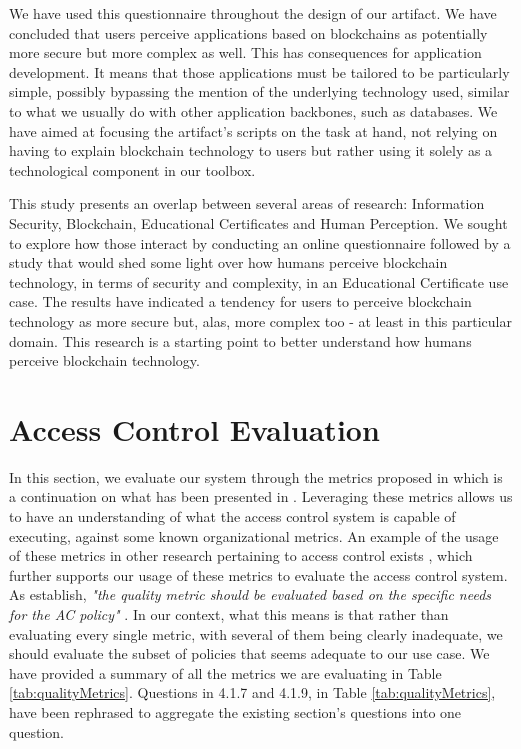 We have used this questionnaire throughout the design of our artifact. We have concluded that users perceive applications based on blockchains as potentially more secure but more complex as well. This has consequences for application development. It means that those applications must be tailored to be particularly simple, possibly bypassing the mention of the underlying technology used, similar to what we usually do with other application backbones, such as databases. We have aimed at focusing the artifact's scripts on the task at hand, not relying on having to explain blockchain technology to users but rather using it solely as a technological component in our toolbox.

This study presents an overlap between several areas of research: Information Security, Blockchain, Educational Certificates and Human Perception. We sought to explore how those interact by conducting an online questionnaire followed by a study that would shed some light over how humans perceive blockchain technology, in terms of security and complexity, in an Educational Certificate use case. The results have indicated a tendency for users to perceive blockchain technology as more secure but, alas, more complex too - at least in this particular domain. This research is a starting point to better understand how humans perceive blockchain technology.

\section{Access Control Evaluation}

In this section, we evaluate our system through the metrics proposed in \cite{hu_guidelines_2012} which is a continuation on what has been presented in \cite{hu_assessment_2006}. Leveraging these metrics allows us to have an understanding of what the access control system is capable of executing, against some known organizational metrics. An example of the usage of these metrics in other research pertaining to access control exists \cite{LE2014184}, which further supports our usage of these metrics to evaluate the access control system. As \citeauthor{hu_guidelines_2012} \cite{hu_guidelines_2012} establish, \emph{"the quality metric should be evaluated based on the specific needs for the AC policy"} \cite[25]{hu_guidelines_2012}. In our context, what this means is that rather than evaluating every single metric, with several of them being clearly inadequate, we should evaluate the subset of policies that seems adequate to our use case. We have provided a summary of all the metrics we are evaluating in Table \ref{tab:qualityMetrics}. Questions in 4.1.7 and 4.1.9, in Table \ref{tab:qualityMetrics}, have been rephrased to aggregate the existing section's questions into one question.

